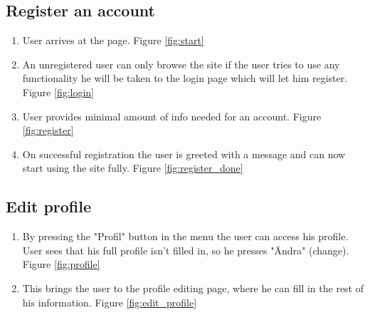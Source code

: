 \documentclass[paper=a4, fontsize=11pt]{report} %
\begin{document}
	\subsection*{Register an account}
	\begin{enumerate}
		\item User arrives at the page. Figure \ref{fig:start}
		\item An unregistered user can only browse the site if the user tries to use any functionality he will be taken to the login page which will let him register. Figure \ref{fig:login}
		\item User provides minimal amount of info needed for an account. Figure \ref{fig:register}
		\item On successful registration the user is greeted with a message and can now start using the site fully. Figure \ref{fig:register_done}
	\end{enumerate}

	\subsection*{Edit profile}
	\begin{enumerate}
		\item By pressing the "Profil" button in the menu the user can access his profile. User sees that his full profile isn't filled in, so he presses "Ändra" (change). Figure \ref{fig:profile}
		\item This brings the user to the profile editing page, where he can fill in the rest of his information. Figure \ref{fig:edit_profile}
	\end{enumerate}
\end{document}
